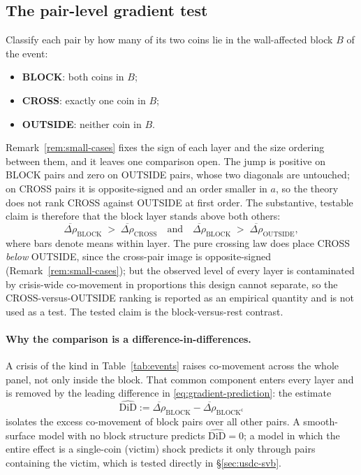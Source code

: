 \subsection{The pair-level gradient test}\label{sec:gradient}
Classify each pair by how many of its two coins lie in the wall-affected block $B$ of the event:
\begin{itemize}[leftmargin=1.6em,itemsep=1pt]
\item \textbf{BLOCK}: both coins in $B$;
\item \textbf{CROSS}: exactly one coin in $B$;
\item \textbf{OUTSIDE}: neither coin in $B$.
\end{itemize}
Remark~\ref{rem:small-cases} fixes the sign of each layer and the size ordering between them, and it leaves one comparison open. The jump is positive on BLOCK pairs and zero on OUTSIDE pairs, whose two diagonals are untouched; on CROSS pairs it is opposite-signed and an order smaller in $a$, so the theory does not rank CROSS against OUTSIDE at first order. The substantive, testable claim is therefore that the block layer stands above both others:
\begin{equation}\label{eq:gradient-prediction}
\overline{\Delta\rho}_{\mathrm{BLOCK}} \;>\; \overline{\Delta\rho}_{\mathrm{CROSS}}
\quad\text{and}\quad
\overline{\Delta\rho}_{\mathrm{BLOCK}} \;>\; \overline{\Delta\rho}_{\mathrm{OUTSIDE}},
\end{equation}
where bars denote means within layer. The pure crossing law does place CROSS \emph{below} OUTSIDE, since the cross-pair image is opposite-signed (Remark~\ref{rem:small-cases}); but the observed level of every layer is contaminated by crisis-wide co-movement in proportions this design cannot separate, so the CROSS-versus-OUTSIDE ranking is reported as an empirical quantity and is not used as a test. The tested claim is the block-versus-rest contrast.

\paragraph{Why the comparison is a difference-in-differences.} A crisis of the kind in Table~\ref{tab:events} raises co-movement across the whole panel, not only inside the block. That common component enters every layer and is removed by the leading difference in \eqref{eq:gradient-prediction}: the estimate
\begin{equation}\label{eq:did}
\widehat{\mathrm{DiD}} := \overline{\Delta\rho}_{\mathrm{BLOCK}} - \overline{\Delta\rho}_{\mathrm{BLOCK}^{\mathsf{c}}}
\end{equation}
isolates the excess co-movement of block pairs over all other pairs. A smooth-surface model with no block structure predicts $\widehat{\mathrm{DiD}} = 0$; a model in which the entire effect is a single-coin (victim) shock predicts it only through pairs containing the victim, which is tested directly in \S\ref{sec:usdc-svb}.

